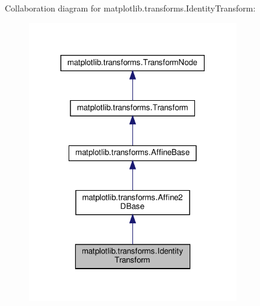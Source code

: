 Collaboration diagram for matplotlib.\+transforms.\+Identity\+Transform\+:
\nopagebreak
\begin{figure}[H]
\begin{center}
\leavevmode
\includegraphics[width=259pt]{classmatplotlib_1_1transforms_1_1IdentityTransform__coll__graph}
\end{center}
\end{figure}
